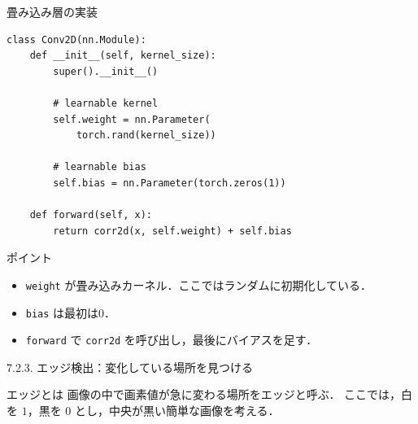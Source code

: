 \documentclass[dvipdfmx,uplatex,unicode,9pt,aspectratio=169]{beamer}
\begin{document}
\begin{frame}[fragile]{畳み込み層の実装}
\begin{lstlisting}
class Conv2D(nn.Module):
    def __init__(self, kernel_size):
        super().__init__()

        # learnable kernel
        self.weight = nn.Parameter(
            torch.rand(kernel_size))

        # learnable bias
        self.bias = nn.Parameter(torch.zeros(1))

    def forward(self, x):
        return corr2d(x, self.weight) + self.bias
\end{lstlisting}
\begin{block}{ポイント}
\begin{itemize}
  \item \texttt{weight} が畳み込みカーネル．ここではランダムに初期化している．
  \item \texttt{bias} は最初は0．
  \item \texttt{forward} で \texttt{corr2d} を呼び出し，最後にバイアスを足す．
\end{itemize}
\end{block}
\end{frame}

\begin{frame}{7.2.3. エッジ検出：変化している場所を見つける}
\begin{block}{エッジとは}
画像の中で画素値が急に変わる場所を\alert{エッジ}と呼ぶ．
ここでは，白を $1$，黒を $0$ とし，中央が黒い簡単な画像を考える．
\end{block}

\begin{center}
\end{center}
\end{frame}
\end{document}
